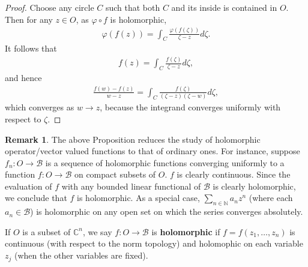 \documentclass[12pt,b5paper,notitlepage]{article}
\theoremstyle{definition}
\newtheorem{rem}[df]{Remark}
\theoremstyle{plain}
\newcommand{\mc}{\mathcal}
\newcommand{\Cbb}{\mathbb C}
\newcommand{\Nbb}{\mathbb N}
\numberwithin{equation}{section}
\begin{document}
\begin{proof}
Choose any circle $C$ such that both $C$ and its inside is contained in $O$. Then for any $z\in O$, as $\varphi\circ f$ is holomorphic, 
\begin{align*}
\varphi(f(z))=\int_C \frac{\varphi(f(\zeta))}{\zeta-z}d\zeta.
\end{align*}
It follows that
\begin{align*}
f(z)=\int_C \frac {f(\zeta)}{\zeta-z}d\zeta,
\end{align*}
and hence
\begin{align*}
\frac{f(w)-f(z)}{w-z}=	\int_C \frac {f(\zeta)}{(\zeta-z)(\zeta-w)}d\zeta,
\end{align*}
which converges as $w\rightarrow z$, because the integrand converges uniformly with respect to $\zeta$.
\end{proof}


\begin{rem}
The above Proposition reduces the study of holomorphic operator/vector valued functions to that of ordinary ones. For instance, suppose $f_n:O\rightarrow\mc B$ is a sequence of holomorphic functions converging uniformly to a function $f:O\rightarrow\mc B$ on compact subsets of $O$. $f$ is clearly continuous. Since the evaluation of $f$ with any bounded linear functional of $\mc B$ is clearly holomorphic, we conclude that $f$ is holomorphic. As a special case, $\sum_{n\in\Nbb} a_nz^n$ (where each $a_n\in\mc B$) is holomorphic on any open set on which the series converges absolutely. 
\end{rem}






If $O$ is a subset of $\Cbb^n$, we say $f:O\rightarrow\mc B$ is \textbf{holomorphic} if $f=f(z_1,\dots,z_n)$ is continuous (with respect to the norm topology) and holomophic on each variable $z_j$ (when the other variables are fixed).
\end{document}
